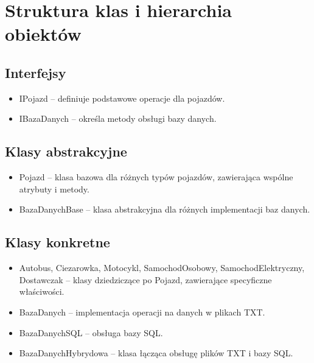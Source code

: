 \section{Struktura klas i hierarchia obiektów}
\subsection*{Interfejsy}
\begin{itemize}
    \item IPojazd – definiuje podstawowe operacje dla pojazdów.
    \item IBazaDanych – określa metody obsługi bazy danych.
\end{itemize}
\subsection*{Klasy abstrakcyjne}
\begin{itemize}
    \item Pojazd – klasa bazowa dla różnych typów pojazdów, zawierająca wspólne atrybuty i metody.
    \item BazaDanychBase – klasa abstrakcyjna dla różnych implementacji baz danych.
\end{itemize}
\subsection*{Klasy konkretne}
\begin{itemize}
    \item Autobus, Ciezarowka, Motocykl, SamochodOsobowy, SamochodElektryczny, Dostawczak – klasy dziedziczące po Pojazd, zawierające specyficzne właściwości.
    \item BazaDanych – implementacja operacji na danych w plikach TXT.
    \item BazaDanychSQL – obsługa bazy SQL.
    \item BazaDanychHybrydowa – klasa łącząca obsługę plików TXT i bazy SQL.
\end{itemize}
